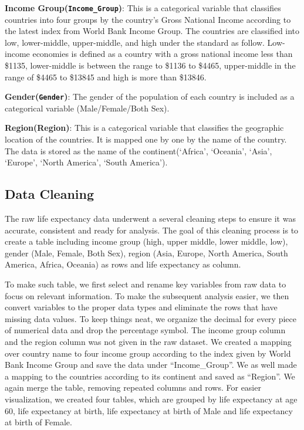 \documentclass[
  letterpaper,
  DIV=11,
  numbers=noendperiod]{scrartcl}
\begin{document}
\textbf{Income Group(\texttt{Income\_Group})}: This is a categorical
variable that classifies countries into four groups by the country's
Gross National Income according to the latest index from World Bank
Income Group. The countries are classified into low, lower-middle,
upper-middle, and high under the standard as follow. Low-income
economies is defined as a country with a gross national income less than
\$1135, lower-middle is between the range to \$1136 to \$4465,
upper-middle in the range of \$4465 to \$13845 and high is more than
\$13846.

\textbf{Gender(\texttt{Gender})}: The gender of the population of each
country is included as a categorical variable (Male/Female/Both Sex).

\textbf{Region(Region)}: This is a categorical variable that classifies
the geographic location of the countries. It is mapped one by one by the
name of the country. The data is stored as the name of the
continent(`Africa', `Oceania', `Asia', `Europe', `North America', `South
America').

\subsection{Data Cleaning}\label{data-cleaning}

The raw life expectancy data underwent a several cleaning steps to
ensure it was accurate, consistent and ready for analysis. The goal of
this cleaning process is to create a table including income group (high,
upper middle, lower middle, low), gender (Male, Female, Both Sex),
region (Asia, Europe, North America, South America, Africa, Oceania) as
rows and life expectancy as column.

To make such table, we first select and rename key variables from raw
data to focus on relevant information. To make the subsequent analysis
easier, we then convert variables to the proper data types and eliminate
the rows that have missing data values. To keep things neat, we organize
the decimal for every piece of numerical data and drop the percentage
symbol. The income group column and the region column was not given in
the raw dataset. We created a mapping over country name to four income
group according to the index given by World Bank Income Group and save
the data under ``Income\_Group''. We as well made a mapping to the
countries according to its continent and saved as ``Region''. We again
merge the table, removing repeated columns and rows. For easier
visualization, we created four tables, which are grouped by life
expectancy at age 60, life expectancy at birth, life expectancy at birth
of Male and life expectancy at birth of Female.
\end{document}
